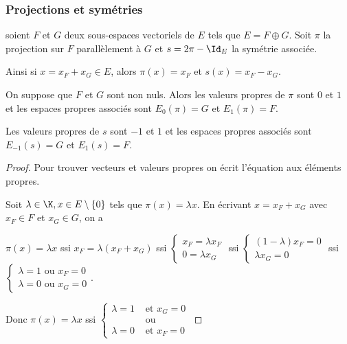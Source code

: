 \subsubsection{Projections et symétries}

\begin{exemple}
    soient $F$ et $G$ deux sous-espaces vectoriels de $E$ tels que $E = F \oplus G$.
    Soit $\pi$ la projection sur $F$ parallèlement à $G$ et $s = 2 \pi - \Id_E$ la symétrie associée. 

    Ainsi si $x = x_F + x_G \in E$, alors $\pi(x) = x_F$ et $s(x) = x_F - x_G$.

    On suppose que $F$ et $G$ sont non nuls. Alors les valeurs propres de $\pi$ sont $0$ et $1$ 
    et les espaces propres associés sont $E_0(\pi) = G$ et $E_1(\pi) = F$.

    Les valeurs propres de $s$ sont $-1$ et $1$ et les espaces propres associés sont 
    $E_{-1}(s) = G$ et $E_1(s) = F$.


    \begin{proof} 
        Pour trouver vecteurs et valeurs propres on écrit l'équation aux éléments propres.

        Soit $\lambda \in \K, x \in E \setminus \{0\}$ tels que $\pi(x) = \lambda x$.
        En écrivant $x = x_F + x_G$ avec $x_F \in F$ et $x_G \in G$, on a
        
        $\pi(x) = \lambda x $ ssi $x_F = \lambda (x_F + x_G)$ ssi $\begin{cases}
        x_F = \lambda x_F \\
        0 = \lambda x_G
        \end{cases}$ ssi $\begin{cases}
        (1 - \lambda) x_F = 0 \\
        \lambda x_G = 0
        \end{cases}$ ssi $\begin{cases}
            \lambda = 1 \text{ ou } x_F = 0 \\
            \lambda = 0 \text{ ou } x_G = 0
        \end{cases}$.

        Donc $\pi(x) = \lambda x$ ssi $\begin{cases}
            \lambda = 1 &\text{ et } x_G = 0 \\
            & \text{ ou } \\
            \lambda = 0 &\text{ et } x_F = 0
        \end{cases}$


\end{proof}
\end{exemple}

